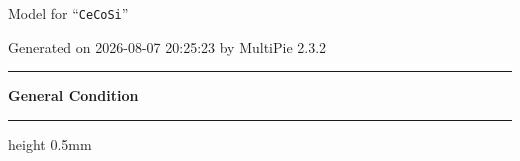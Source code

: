 \documentclass[fleqn,10pt,landscape]{jsarticle}
\begin{document}
\setcounter{MaxMatrixCols}{32}

\renewcommand{\tablename}{Table~}
\renewcommand{\figurename}{Figure~}
\setlength{\baselineskip}{16pt}
\setlength{\parindent}{0pt}
\setlength{\mathindent}{0pt}
\footnotesize
\begin{center}
\LARGE
Model for ``\texttt{CeCoSi}''
\end{center}
\begin{flushright}
Generated on 2026-08-07 20:25:23 by MultiPie 2.3.2
\end{flushright}
\setlength{\baselineskip}{16pt}
\footnotesize
\vspace{5mm}
\noindent \rule[0.5mm]{5mm}{0.5mm}\hspace{3mm}\textbf{General Condition}\hspace{3mm}\leaders\hrule height 0.5mm\hfill\kern0pt
\vspace{3mm}
\end{document}
